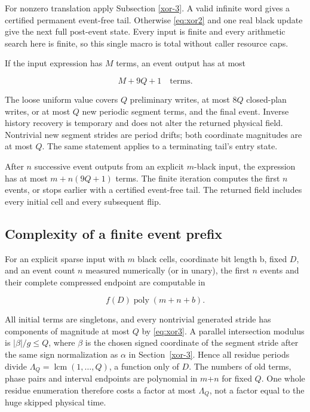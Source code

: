 \documentclass[
  11pt,
]{article}
\begin{document}
For nonzero translation apply Subsection \ref{xor-3}. A valid infinite
word gives a certified permanent event-free tail. Otherwise \eqref{eq:xor2} and
one real black update give the next full post-event state. Every input
is finite and every arithmetic search here is finite, so this single
macro is total without caller resource caps.

If the input expression has \(M\) terms, an event output has at most

\begin{equation}\label{eq:xor3}
M+9Q+1\quad\text{terms}.
\end{equation}

The loose uniform value covers \(Q\) preliminary writes, at most \(8Q\)
closed-plan writes, or at most \(Q\) new periodic segment terms, and the
final event. Inverse history recovery is temporary and does not alter
the returned physical field. Nontrivial new segment strides are period
drifts; both coordinate magnitudes are at most \(Q\). The same statement
applies to a terminating tail's entry state.

After $n$ successive event outputs from an explicit $m$-black input,
the expression has at most $m+n(9Q+1)$ terms. The finite iteration computes
the first $n$ events, or stops earlier with a certified event-free tail.
The returned field includes every initial cell and every subsequent flip.

\subsection{Complexity of a finite event prefix}\label{xor-6}

For an explicit sparse input with \(m\) black cells, coordinate bit length
b, fixed \(D\), and an event count \(n\) measured numerically (or in unary), the
first \(n\) events and their complete compressed endpoint are computable in

\begin{equation}\label{eq:xor4}
f(D)\operatorname{poly}(m+n+b).
\end{equation}

All initial
terms are singletons, and every nontrivial generated stride has
components of magnitude at most \(Q\) by \eqref{eq:xor3}. A parallel intersection
modulus is \(|\beta|/g\le Q\), where \(\beta\) is the chosen
signed coordinate of the segment stride after the same sign normalization
as \(\alpha\) in Section~\ref{xor-3}. Hence all residue periods
divide $\Lambda_Q=\operatorname{lcm}(1,\ldots,Q)$, a function only of \(D\). The numbers of
old terms, phase pairs and interval endpoints are polynomial in \(m\)+\(n\) for
fixed \(Q\). One whole residue enumeration therefore costs a factor at most
$\Lambda_Q$, not a factor equal to the huge skipped physical time.
\end{document}
